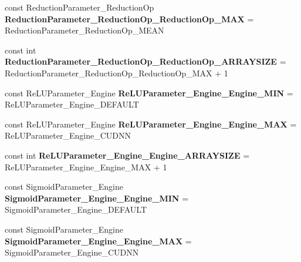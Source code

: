 \begin{DoxyCompactItemize}
\item 
\mbox{\label{namespacecaffe_a45dd32c24be2b909c05cc5f5018153ab}} 
const Reduction\+Parameter\+\_\+\+Reduction\+Op {\bfseries Reduction\+Parameter\+\_\+\+Reduction\+Op\+\_\+\+Reduction\+Op\+\_\+\+M\+AX} = Reduction\+Parameter\+\_\+\+Reduction\+Op\+\_\+\+M\+E\+AN
\item 
\mbox{\label{namespacecaffe_a06ec01f0f828c23ce18da81be024fb38}} 
const int {\bfseries Reduction\+Parameter\+\_\+\+Reduction\+Op\+\_\+\+Reduction\+Op\+\_\+\+A\+R\+R\+A\+Y\+S\+I\+ZE} = Reduction\+Parameter\+\_\+\+Reduction\+Op\+\_\+\+Reduction\+Op\+\_\+\+M\+AX + 1
\item 
\mbox{\label{namespacecaffe_a686e35718f608b5abe95f10d77797f53}} 
const Re\+L\+U\+Parameter\+\_\+\+Engine {\bfseries Re\+L\+U\+Parameter\+\_\+\+Engine\+\_\+\+Engine\+\_\+\+M\+IN} = Re\+L\+U\+Parameter\+\_\+\+Engine\+\_\+\+D\+E\+F\+A\+U\+LT
\item 
\mbox{\label{namespacecaffe_a99774ba0e144988d2c5242bd01f8c068}} 
const Re\+L\+U\+Parameter\+\_\+\+Engine {\bfseries Re\+L\+U\+Parameter\+\_\+\+Engine\+\_\+\+Engine\+\_\+\+M\+AX} = Re\+L\+U\+Parameter\+\_\+\+Engine\+\_\+\+C\+U\+D\+NN
\item 
\mbox{\label{namespacecaffe_a552ea539219f3068833dd56c04bdabbe}} 
const int {\bfseries Re\+L\+U\+Parameter\+\_\+\+Engine\+\_\+\+Engine\+\_\+\+A\+R\+R\+A\+Y\+S\+I\+ZE} = Re\+L\+U\+Parameter\+\_\+\+Engine\+\_\+\+Engine\+\_\+\+M\+AX + 1
\item 
\mbox{\label{namespacecaffe_aa96ae7f95ba2a9633021a1137fd7e872}} 
const Sigmoid\+Parameter\+\_\+\+Engine {\bfseries Sigmoid\+Parameter\+\_\+\+Engine\+\_\+\+Engine\+\_\+\+M\+IN} = Sigmoid\+Parameter\+\_\+\+Engine\+\_\+\+D\+E\+F\+A\+U\+LT
\item 
\mbox{\label{namespacecaffe_a1ba297af948111f6ce8a8a052ae0e697}} 
const Sigmoid\+Parameter\+\_\+\+Engine {\bfseries Sigmoid\+Parameter\+\_\+\+Engine\+\_\+\+Engine\+\_\+\+M\+AX} = Sigmoid\+Parameter\+\_\+\+Engine\+\_\+\+C\+U\+D\+NN
\item 
\mbox{\label{namespacecaffe_ac201cdd104792e9c76c5292cb6c26000}} 

\end{DoxyCompactItemize}
